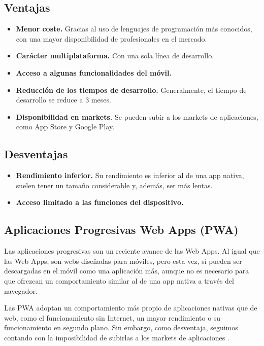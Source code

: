 \subsection*{Ventajas}
\begin{itemize}
	\item \textbf{Menor coste.} Gracias al uso de lenguajes de programación más conocidos, con una mayor disponibilidad de profesionales en el mercado.
	\item \textbf{Carácter multiplataforma.} Con una sola línea de desarrollo.
	\item \textbf{Acceso a algunas funcionalidades del móvil.}
	\item \textbf{Reducción de los tiempos de desarrollo.} Generalmente, el tiempo de desarrollo se reduce a 3 meses.
	\item \textbf{Disponibilidad en markets.} Se pueden subir a los markets de aplicaciones, como App Store y Google Play.
\end{itemize}

\subsection*{Desventajas}
\begin{itemize}
	\item \textbf{Rendimiento inferior.} Su rendimiento es inferior al de una app nativa, suelen tener un tamaño considerable y, además, ser más lentas.
	\item \textbf{Acceso limitado a las funciones del dispositivo.}
\end{itemize}

\subsection{Aplicaciones Progresivas Web Apps (PWA)}

Las aplicaciones progresivas son un reciente avance de las Web Apps. Al igual que las Web Apps, son webs diseñadas para móviles, pero esta vez, sí pueden ser descargadas en el móvil como una aplicación más, aunque no es necesario para que ofrezcan un comportamiento similar al de una app nativa a través del navegador. 

Las PWA adoptan un comportamiento más propio de aplicaciones nativas que de web, como el funcionamiento sin Internet, un mayor rendimiento o su funcionamiento en segundo plano. Sin embargo, como desventaja, seguimos contando con la imposibilidad de subirlas a los markets de aplicaciones \cite{IM1}. 

